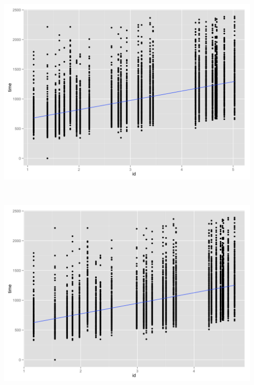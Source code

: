 \begin{minipage}{\linewidth}
\begin{minipage}[b]{0.45\linewidth}
		\label{fig:fitt_affine_line}
	\end{minipage}
	\begin{minipage}[b]{0.45\linewidth}
		\includegraphics[width=\textwidth]{images/plots/plot_model_meyer}
		\label{fig:meyer_affine_line}
	\end{minipage}
	\begin{minipage}[b]{0.1\linewidth}
	~
	\end{minipage}
	\begin{minipage}[b]{0.45\linewidth}
		\includegraphics[width=\textwidth]{images/plots/plot_model_mackenzie}
		\label{fig:mackenzie_affine_line}
	\end{minipage}
\end{minipage}

